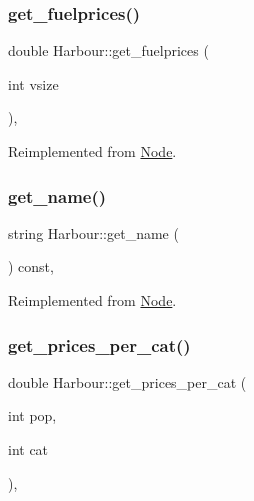\subsubsection{\texorpdfstring{get\_fuelprices()}{get\_fuelprices()}}
{\footnotesize\ttfamily double Harbour\+::get\+\_\+fuelprices (\begin{DoxyParamCaption}\item[{int}]{vsize }\end{DoxyParamCaption})\hspace{0.3cm}{\ttfamily [override]}, {\ttfamily [virtual]}}



Reimplemented from \mbox{\hyperlink{class_node_ae9b986333df35cc09864019209dbef88}{Node}}.

\mbox{\label{class_harbour_a515714090da250f1a433185e8a57ce83}} 
\subsubsection{\texorpdfstring{get\_name()}{get\_name()}}
{\footnotesize\ttfamily string Harbour\+::get\+\_\+name (\begin{DoxyParamCaption}{ }\end{DoxyParamCaption}) const\hspace{0.3cm}{\ttfamily [override]}, {\ttfamily [virtual]}}



Reimplemented from \mbox{\hyperlink{class_node_afd4050178cc0d4eb0ff137466dcafdd8}{Node}}.

\mbox{\label{class_harbour_a2eec3ef3caca2336f7d0579fd2ba6d73}} 
\subsubsection{\texorpdfstring{get\_prices\_per\_cat()}{get\_prices\_per\_cat()}}
{\footnotesize\ttfamily double Harbour\+::get\+\_\+prices\+\_\+per\+\_\+cat (\begin{DoxyParamCaption}\item[{int}]{pop,  }\item[{int}]{cat }\end{DoxyParamCaption})\hspace{0.3cm}{\ttfamily [override]}, {\ttfamily [virtual]}}



